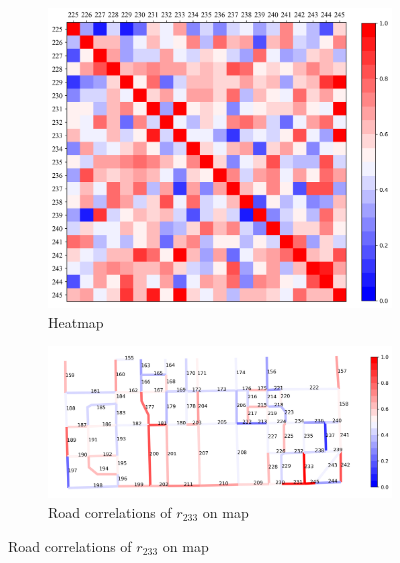 \begin{figure}[htb]
    \centering
    \caption{Visualization of road correlations.}
    \label{fig: vis_road_cor}
    \begin{subfigure}[t]{0.33\linewidth}
        \centering
        \includegraphics[width=\textwidth]{images/heatmap_bwr.png}
        \caption{Heatmap}
        \label{fig: heatmap}
    \end{subfigure}
    \begin{subfigure}[t]{0.66\linewidth}
        \centering
        \includegraphics[width=\textwidth]{images/road_correlation.png}
        \caption{Road correlations of $r_{233}$ on map}
        \label{fig: road_correlation_map}
    \end{subfigure}
\end{figure}


